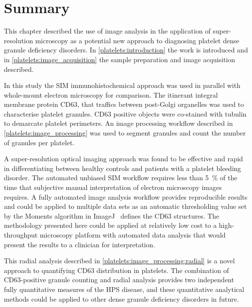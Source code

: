 \section{Summary}
\label{platelets:summary}
This chapter described the use of image analysis in the application of super-resolution microscopy as a potential new approach to diagnosing platelet dense granule deficiency disorders. In \autoref{platelets:introduction} the work is introduced and in \autoref{platelets:image_acquisition} the sample preparation and image acquisition described.

In this study the SIM immunohistochemical approach was used in parallel with whole-mount electron microscopy for comparison. The itinerant integral membrane protein CD63, that traffics between post-Golgi organelles was used to characterise platelet granules. CD63 positive objects were co-stained with tubulin to demarcate platelet perimeters. An image processing workflow described in \autoref{platelets:image_processing} was used to segment granules and count the number of granules per platelet.

A super-resolution optical imaging approach was found to be effective and rapid in differentiating between healthy controls and patients with a platelet bleeding disorder. The automated unbiased SIM workflow requires less than \SI{5}{\percent} of the time that subjective manual interpretation of electron microscopy images requires. A fully automated image analysis workflow provides reproducible results and could be applied to multiple data sets as an automatic thresholding value set by the Moments algorithm in ImageJ~\cite{Schneider2012} defines the CD63 structures. The methodology presented here could be applied at relatively low cost to a high-throughput microscopy platform with automated data analysis that would present the results to a clinician for interpretation.

This radial analysis described in \autoref{platelets:image_processing:radial} is a novel approach to quantifying CD63 distribution in platelets. The combination of CD63-positive granule counting and radial analysis provides two independent fully quantitative measures of the HPS disease, and these quantitative analytical methods could be applied to other dense granule deficiency disorders in future.

